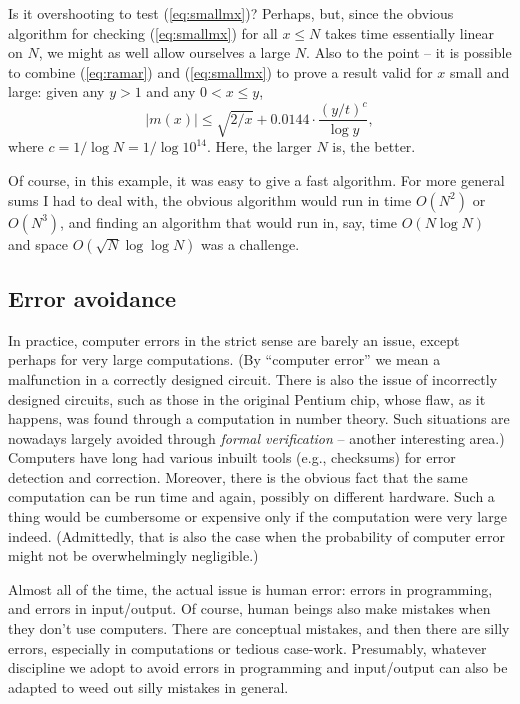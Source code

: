   Is it overshooting to test (\ref{eq:smallmx})? Perhaps, but, since the
  obvious algorithm for checking (\ref{eq:smallmx}) for all $x\leq N$ takes
  time essentially linear on $N$, we might as well allow ourselves a large $N$.
  Also to the point -- it is possible to combine (\ref{eq:ramar}) and
  (\ref{eq:smallmx}) to prove a result valid for $x$ small and large:
  given any $y>1$ and any $0<x\leq y$,
  \[|m(x)|\leq \sqrt{2/x} + 0.0144\cdot \frac{(y/t)^c}{\log y},\]
  where $c=1/\log N= 1/\log 10^{14}$. Here, the larger $N$ is, the better.
  
  Of course, in this example, it was easy to give a fast algorithm. For
  more general sums I had to deal with, the obvious algorithm would run in
  time $O(N^2)$ or $O(N^3)$, and finding an algorithm that would run in,
  say, time $O(N \log N)$ and space $O(\sqrt{N} \log \log N)$ was a challenge.
  
  
\subsection{Error avoidance}

In practice, computer errors in the strict sense
are barely an issue, except perhaps for very large computations. (By
``computer error'' we mean a malfunction in a correctly designed circuit.
There is also the issue of incorrectly designed circuits, such as those in the
original Pentium chip, whose flaw, as it happens, was found through a
computation in number theory. Such situations are nowadays largely avoided
through {\em formal verification} -- another interesting area.)
Computers have long had various inbuilt tools (e.g., checksums) for error
detection and correction. Moreover, there is the obvious fact that the same
computation can be run time and again, possibly on different hardware.
Such a thing would be cumbersome or expensive
only if the computation were very large indeed.
(Admittedly, that is also the case when the probability of computer
error might not be overwhelmingly negligible.)

Almost all of the time, the actual issue is human error: errors in programming,
and errors in input/output. Of course, human beings
also make mistakes when they don't use computers. There are conceptual
mistakes, and then there are silly errors,
especially in computations or tedious case-work. Presumably, whatever discipline
we adopt to avoid errors in programming and input/output can also be adapted
to weed out silly mistakes in general.

